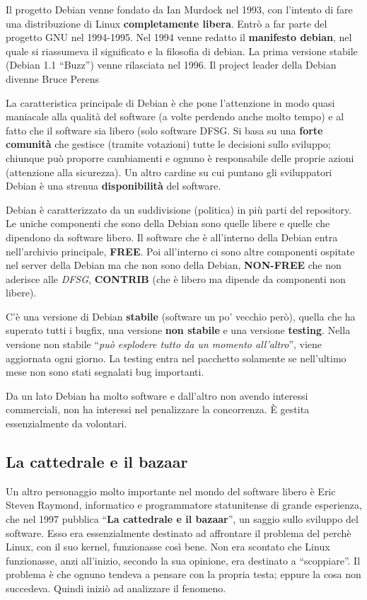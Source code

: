 Il progetto Debian venne fondato da Ian Murdock nel 1993, con l'intento di fare una distribuzione di Linux \textbf{completamente libera}. Entrò a far parte del progetto GNU nel 1994-1995. Nel 1994 venne redatto il \textbf{manifesto debian}, nel quale si riassumeva il significato e la filosofia di debian. La prima versione stabile (Debian 1.1 ``Buzz'') venne rilasciata nel 1996. Il project leader della Debian divenne Bruce Perens

La caratteristica principale di Debian è che pone l'attenzione in modo quasi maniacale alla qualità del software (a volte perdendo anche molto tempo) e al fatto che il software sia libero (solo software DFSG. Si basa su una \textbf{forte comunità} che gestisce (tramite votazioni) tutte le decisioni sullo sviluppo; chiunque può proporre cambiamenti e ognuno è responsabile delle proprie azioni (attenzione alla sicurezza). Un altro cardine su cui puntano gli sviluppatori Debian è una strenua \textbf{disponibilità} del software.

Debian è caratterizzato da un suddivisione (politica) in più parti del repository. Le uniche componenti che sono della Debian sono quelle libere e quelle che dipendono da software libero. Il software che è all'interno della Debian entra nell'archivio principale, \textbf{FREE}. Poi all'interno ci sono altre componenti ospitate nel server della Debian ma che non sono della Debian, \textbf{NON-FREE} che non aderisce alle \textit{DFSG}, \textbf{CONTRIB} (che è libero ma dipende da componenti non libere).

C'è una versione di Debian \textbf{stabile} (software un po' vecchio però), quella che ha superato tutti i bugfix, una versione \textbf{non stabile} e una versione \textbf{testing}. Nella versione non stabile ``\textit{può esplodere tutto da un momento all'altro}'', viene aggiornata ogni giorno. La testing entra nel pacchetto solamente se nell'ultimo mese non sono stati segnalati bug importanti.

Da un lato Debian ha molto software e dall'altro non avendo interessi commerciali, non ha interessi nel penalizzare la concorrenza. È gestita essenzialmente da volontari.

\subsection{La cattedrale e il bazaar}

Un altro personaggio molto importante nel mondo del software libero è Eric Steven Raymond, informatico e programmatore statunitense di grande esperienza, che nel 1997 pubblica ``\textbf{La cattedrale e il bazaar}'', un saggio sullo sviluppo del software. Esso era essenzialmente destinato ad affrontare il problema del perchè Linux, con il suo kernel, funzionasse così bene. Non era scontato che Linux funzionasse, anzi all'inizio, secondo la sua opinione, era destinato a ``scoppiare''. Il problema è che ognuno tendeva a pensare con la propria testa; eppure la cosa non succedeva. Quindi iniziò ad analizzare il fenomeno. 

